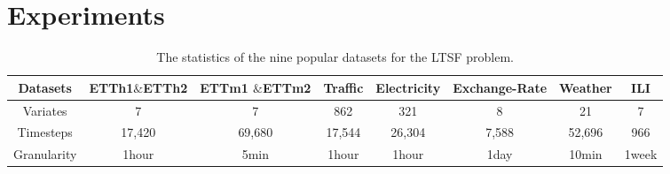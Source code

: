 

\section{Experiments}
\label{sec:exp}


\begin{table}[h]
\vspace{-0.4cm}
\begin{center}
\scalebox{0.8}
{
\begin{tabular}{c|ccccccc} \hline
Datasets       & ETTh1$\&$ETTh2       & ETTm1 $\&$ETTm2        & Traffic     & Electricity  & Exchange-Rate & Weather      & ILI      \\ \hline
Variates       & 7          & 7            & 862         & 321          & 8             & 21          & 7      \\
Timesteps      & 17,420     & 69,680       & 17,544      & 26,304       & 7,588         & 52,696       & 966     \\
Granularity    & 1hour      & 5min         & 1hour       & 1hour        & 1day          & 10min        & 1week    \\ \hline
\end{tabular}}
\end{center}
\vspace{-0.5cm}
\caption{The statistics of the nine popular datasets for the LTSF problem.}
\label{tab:datasets}
\vspace{-0.2cm}
\end{table}


